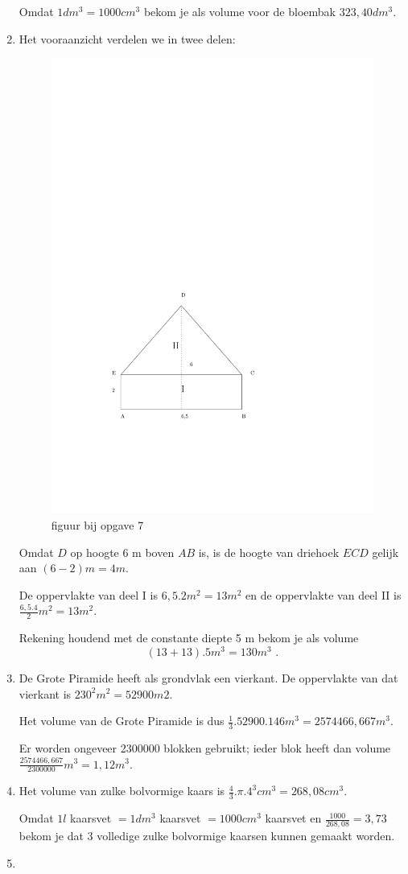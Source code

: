 \documentclass{article}
\begin{document}
\begin{enumerate}
Omdat $1 dm^3=1000 cm^3$ bekom je als volume voor de bloembak $323,40 dm^3$.

\item

Het vooraanzicht verdelen we in twee delen:

\begin{figure}[h]
\begin{center}
\includegraphics[height=5 cm]{TestOppInhoud7.pdf}
\caption{figuur bij opgave 7}
\end{center}
\end{figure}

Omdat $D$ op hoogte 6 m boven $AB$ is, is de hoogte van driehoek $ECD$ gelijk aan $(6-2) m = 4 m$.

De oppervlakte van deel I is $6,5.2 m^2=13 m^2$ en de oppervlakte van deel II is $\frac{6,5.4}{2} m^2=13 m^2$.

Rekening houdend met de constante diepte 5 m bekom je als volume
\[
(13+13).5 m^3 = 130 m^3 \text { .}
\]

\item

De Grote Piramide heeft als grondvlak een vierkant.
De oppervlakte van dat vierkant is $230^2 m^2=52900 m2$.

Het volume van de Grote Piramide is dus $\frac{1}{3} . 52900.146 m^3=2574466,667 m^3$.

Er worden ongeveer 2300000 blokken gebruikt; ieder blok heeft dan volume $\frac{2574466,667}{2300000} m^3 = 1,12 m^3$.

\item

Het volume van zulke bolvormige kaars is $\frac{4}{3}.\pi.4^3 cm^3=268,08 cm^3$.

Omdat $1 l$ kaarsvet $= 1 dm^3$ kaarsvet $= 1000 cm^3$ kaarsvet en $\frac{1000}{268,08}=3,73$ bekom je dat 3 volledige zulke bolvormige kaarsen kunnen gemaakt worden.

\item


\end{enumerate}
\end{document}
